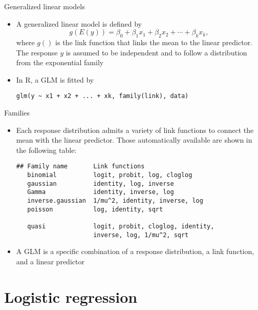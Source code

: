 \documentclass{beamer}
\begin{document}
\begin{frame}[fragile]{Generalized linear models}
  \begin{itemize}
    \item A generalized linear model is defined by
\[
  g(E(y)) = \beta_0 + \beta_1 x_1 + \beta_2 x_2 + \cdots + \beta_k x_k,
\]
where $g()$ is the link function that links the mean to the linear predictor.
The response $y$ is assumed to be independent and to follow a distribution
from the exponential family

\item In R, a GLM is fitted by

  \begin{lstlisting}[style=plain]
  glm(y ~ x1 + x2 + ... + xk, family(link), data)
\end{lstlisting}
  \end{itemize}
\end{frame}

\begin{frame}[fragile]{Families}
  \begin{itemize}
    \item Each response distribution admits a variety of link functions to
      connect the mean with the linear predictor. Those automatically
      available are shown in the following table:

  \begin{lstlisting}[style=plain]
## Family name       Link functions
   binomial          logit, probit, log, cloglog
   gaussian          identity, log, inverse
   Gamma             identity, inverse, log
   inverse.gaussian  1/mu^2, identity, inverse, log
   poisson           log, identity, sqrt

   quasi             logit, probit, cloglog, identity,
                     inverse, log, 1/mu^2, sqrt
\end{lstlisting}
\item A GLM is a specific combination of a response distribution, a link
  function, and a linear predictor
  \end{itemize}
\end{frame}

\section{Logistic regression}
\end{document}
